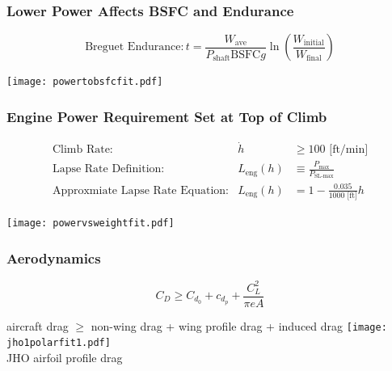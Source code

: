 \documentclass{beamer}
\begin{document}
\begin{frame}
    \frametitle{Lower Power Affects BSFC and Endurance}

    \pause
    \[ \text{Breguet Endurance}: t = \frac{W_{\text{ave}}}{P_{\text{shaft}}\text{BSFC}g} \ln{\left( \frac{W_{\text{initial}}}{W_{\text{final}}}\right)} \]
        
    \pause
    \begin{center}
    \texttt{[image: powertobsfcfit.pdf]}
    \end{center}

\end{frame}
        
\begin{frame}
    \frametitle{Engine Power Requirement Set at Top of Climb}

    \pause
    \scriptsize
    \[ \begin{array}{rrl}
            \text{Climb Rate}: & \dot{h} &\geq 100 \text{ [ft/min]} \\
            \text{Lapse Rate Definition}: &L_{\text{eng}}(h) &\equiv \frac{P_{\text{max}}}{P_{\text{SL-max}}} \\
            \text{Approxmiate Lapse Rate Equation}: & L_{\text{eng}}(h) &= 1 - \frac{0.035}{1000 \text{ [ft]}} h
    \end{array} \]

    \pause
    \begin{center}
    \texttt{[image: powervsweightfit.pdf]}
    \end{center}

\end{frame}

\begin{frame}
    \frametitle{Aerodynamics}

    \pause
    \[ C_D \geq C_{d_0} + c_{d_p} + \frac{C_L^2}{\pi e A} \]

    \begin{center}
    aircraft drag $\geq$ non-wing drag + wing profile drag + induced drag
    \pause
    \texttt{[image: jho1polarfit1.pdf]} \\
    \scriptsize
    JHO airfoil profile drag
    \end{center}
    
\end{frame}
\end{document}
